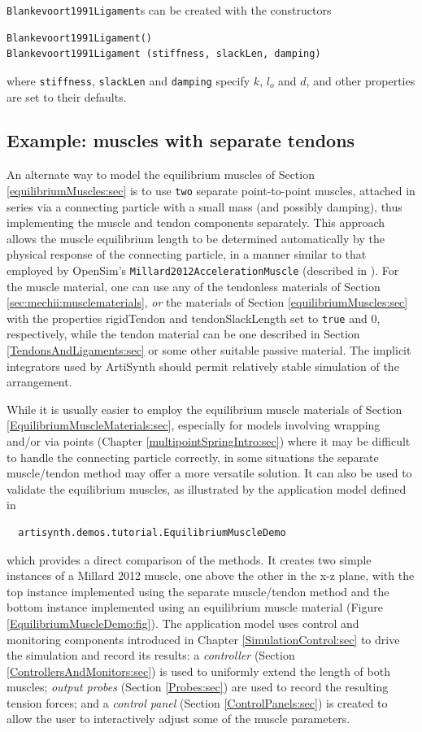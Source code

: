 {\tt Blankevoort1991Ligament}s can be created with the constructors
\begin{lstlisting}[]
Blankevoort1991Ligament()
Blankevoort1991Ligament (stiffness, slackLen, damping)
\end{lstlisting}
%
where {\tt stiffness}, {\tt slackLen} and {\tt damping} specify $k$,
$l_o$ and $d$, and other properties are set to their defaults.

\subsection{Example: muscles with separate tendons}

An alternate way to model the equilibrium muscles of Section
\ref{equilibriumMuscles:sec} is to use {\tt two} separate
point-to-point muscles, attached in series via a connecting particle
with a small mass (and possibly damping), thus implementing the muscle
and tendon components separately. This approach allows the muscle
equilibrium length to be determined automatically by the physical
response of the connecting particle, in a manner similar to that
employed by OpenSim's {\tt Millard2012AccelerationMuscle} (described
in \cite{millard2012computationally}). For the muscle material, one
can use any of the tendonless materials of Section
\ref{sec:mechii:musclematerials}, {\it or} the materials of Section
\ref{equilibriumMuscles:sec} with the properties {\sf rigidTendon} and
{\sf tendonSlackLength} set to {\tt true} and $0$, respectively, while
the tendon material can be one described in Section
\ref{TendonsAndLigaments:sec} or some other suitable passive material.
The implicit integrators used by ArtiSynth should permit relatively
stable simulation of the arrangement.

While it is usually easier to employ the equilibrium muscle materials
of Section \ref{EquilibriumMuscleMaterials:sec}, especially for models
involving wrapping and/or via points (Chapter
\ref{multipointSpringIntro:sec}) where it may be difficult to handle
the connecting particle correctly, in some situations the separate
muscle/tendon method may offer a more versatile solution. It can also
be used to validate the equilibrium muscles, as illustrated by the
application model defined in
%
\begin{verbatim}
  artisynth.demos.tutorial.EquilibriumMuscleDemo
\end{verbatim}
%
which provides a direct comparison of the methods. It creates two
simple instances of a Millard 2012 muscle, one above the other in the
x-z plane, with the top instance implemented using the separate
muscle/tendon method and the bottom instance implemented using an
equilibrium muscle material (Figure
\ref{EquilibriumMuscleDemo:fig}). The application model uses control
and monitoring components introduced in Chapter
\ref{SimulationControl:sec} to drive the simulation and record its
results: a {\it controller} (Section \ref{ControllersAndMonitors:sec})
is used to uniformly extend the length of both muscles; {\it output
probes} (Section \ref{Probes:sec}) are used to record the resulting
tension forces; and a {\it control panel} (Section
\ref{ControlPanels:sec}) is created to allow the user to interactively
adjust some of the muscle parameters.

